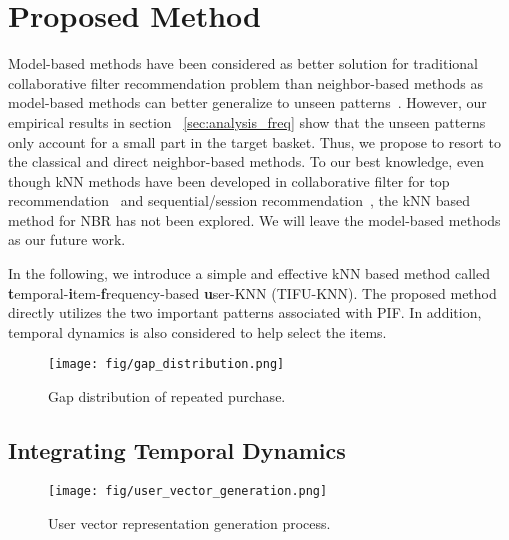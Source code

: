 \documentclass[sigconf]{acmart}
\begin{document}
\section{Proposed Method}
\label{sec:method}

Model-based methods have  been considered as better solution for traditional collaborative filter recommendation problem than neighbor-based methods as model-based methods can better  generalize to unseen patterns~\cite{ning2015comprehensive}. However, our empirical  results in section  ~\ref{sec:analysis_freq} show that the unseen patterns only account for a small part in the target basket. Thus, we propose to resort to the classical and direct neighbor-based methods. To  our best knowledge, even  though kNN methods have  been developed in  collaborative filter for top   recommendation~\cite{konstan1997grouplens}\cite{deshpande2004item}
 and  sequential/session  recommendation~\cite{jannach2017recurrent}, the kNN  based method for NBR has not been explored. We will leave the model-based methods as our future work.

In the following,  we introduce a simple and effective kNN based  method called  \textbf{t}emporal-\textbf{i}tem-\textbf{f}requency-based  \textbf{u}ser-KNN (TIFU-KNN).  The proposed method directly utilizes  the two important  patterns associated with PIF.  In addition, temporal dynamics is also considered to help select the items. 


\begin{figure}[!t]
\centerline{\texttt{[image: fig/gap\_distribution.png]}}
\caption{Gap distribution of repeated purchase.}
\label{fig:gap_distribution}
\end{figure}

\subsection{Integrating Temporal Dynamics}






\begin{figure*}[!t]
\centerline{\texttt{[image: fig/user\_vector\_generation.png]}}
\caption{User vector representation generation process.}
\label{fig:user_vector}
\end{figure*}
\end{document}
